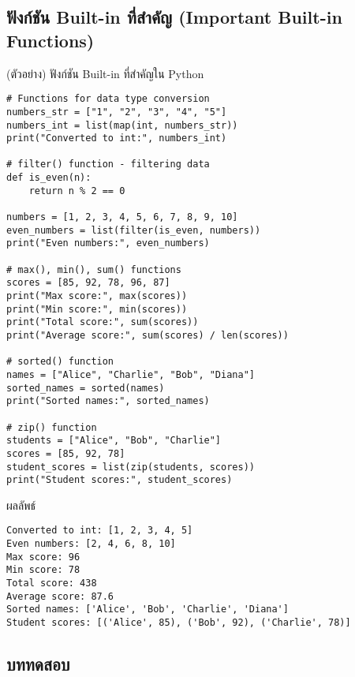\documentclass[12pt,a4paper]{article}
\newcommand{\textlight}[1]{{\thailightfont #1}}
\begin{document}
\subsection{ฟังก์ชัน Built-in ที่สำคัญ (Important Built-in Functions)}

\hspace{1cm}\textlight{Python มีฟังก์ชัน Built-in จำนวนมากที่พร้อมใช้งานทันทีโดยไม่ต้อง import เพิ่มเติม ฟังก์ชันเหล่านี้ช่วยให้นักศึกษาสามารถเขียนโปรแกรมได้อย่างมีประสิทธิภาพมากขึ้น เช่น การแปลงข้อมูล การกรองข้อมูล หรือการคำนวณค่าสถิติพื้นฐาน ซึ่งเป็นทักษะที่จำเป็นในการพัฒนาโปรแกรม}

\begin{codebox}{(ตัวอย่าง) ฟังก์ชัน Built-in ที่สำคัญใน Python}
\begin{lstlisting}[style=python]
# Functions for data type conversion
numbers_str = ["1", "2", "3", "4", "5"]
numbers_int = list(map(int, numbers_str))
print("Converted to int:", numbers_int)

# filter() function - filtering data
def is_even(n):
    return n % 2 == 0

numbers = [1, 2, 3, 4, 5, 6, 7, 8, 9, 10]
even_numbers = list(filter(is_even, numbers))
print("Even numbers:", even_numbers)

# max(), min(), sum() functions
scores = [85, 92, 78, 96, 87]
print("Max score:", max(scores))
print("Min score:", min(scores))
print("Total score:", sum(scores))
print("Average score:", sum(scores) / len(scores))

# sorted() function
names = ["Alice", "Charlie", "Bob", "Diana"]
sorted_names = sorted(names)
print("Sorted names:", sorted_names)

# zip() function
students = ["Alice", "Bob", "Charlie"]
scores = [85, 92, 78]
student_scores = list(zip(students, scores))
print("Student scores:", student_scores)
\end{lstlisting}
\end{codebox}

\begin{resultbox}{ผลลัพธ์}
\begin{verbatim}
Converted to int: [1, 2, 3, 4, 5]
Even numbers: [2, 4, 6, 8, 10]
Max score: 96
Min score: 78
Total score: 438
Average score: 87.6
Sorted names: ['Alice', 'Bob', 'Charlie', 'Diana']
Student scores: [('Alice', 85), ('Bob', 92), ('Charlie', 78)]
\end{verbatim}
\end{resultbox}

\subsection{บททดสอบ}
\end{document}
